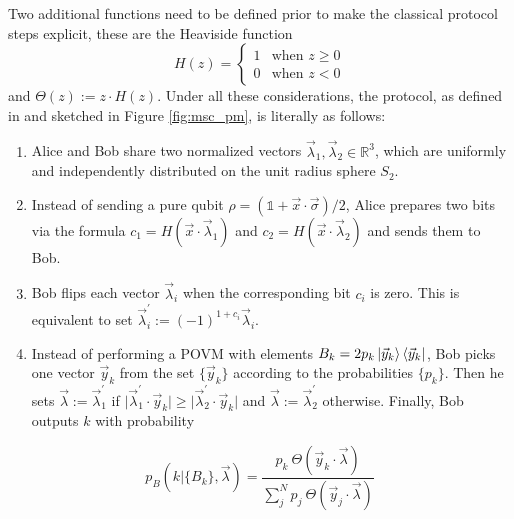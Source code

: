Two additional functions need to be defined prior to make the classical protocol steps explicit, these are the Heaviside function
\begin{equation}
H(z) =
    \begin{cases}
      1 & \text{when $z \ge 0$}\\
      0 & \text{when $z<0$}
    \end{cases} 
\end{equation}
and $\Theta(z) := z \cdot H(z)$. Under all these considerations, the protocol, as defined in \cite{renner2023} and sketched in Figure \ref{fig:msc_pm}, is literally as follows:
\begin{enumerate}
 \item Alice and Bob share two normalized vectors $\vec{\lambda}_1, \vec{\lambda}_2 \in \mathbb{R}^{3}$, which are uniformly and independently distributed on the unit radius sphere $S_2$.
 \item Instead of sending a pure qubit $\rho = (\mathbb{1} + \vec{x} \cdot \vec{\sigma})/2$, Alice prepares two bits via the formula $c_1= H(\vec{x} \cdot \vec{\lambda}_1)$ and $c_2= H(\vec{x} \cdot \vec{\lambda}_2)$ and sends them to Bob.
 \item Bob flips each vector $\vec{\lambda}_i$ when the corresponding bit $c_i$ is zero. This is equivalent to set $\vec{\lambda}^{\prime}_{i} := (-1)^{1 + c_i} \vec{\lambda}_{i}$.
 \item Instead of performing a POVM with elements $B_{k} = 2p_{k}\ket{\vec{y}_{k}}\bra{\vec{y}_{k}}$, Bob picks one vector $\vec{y}_{k}$ from the set $\{\vec{y}_{k}\}$ according to the probabilities $\{p_{k}\}$. Then he sets $\vec{\lambda} := \vec{\lambda}^{\prime}_1$ if $\lvert \vec{\lambda}^{\prime}_1 \cdot \vec{y}_{k} \rvert \ge \lvert \vec{\lambda}^{\prime}_2 \cdot \vec{y}_{k} \rvert$ and $\vec{\lambda} := \vec{\lambda}^{\prime}_2$ otherwise. Finally, Bob outputs $k$ with probability
\end{enumerate}

\begin{equation}\label{eq:prob_classic_bob}
p_B(k|\{B_{k}\},\vec{\lambda}) = \frac{p_{k}\ \Theta(\vec{y}_{k} \cdot \vec{\lambda})}{\sum_{j}^{N}p_j\ \Theta(\vec{y}_j \cdot \vec{\lambda})}
\end{equation}

